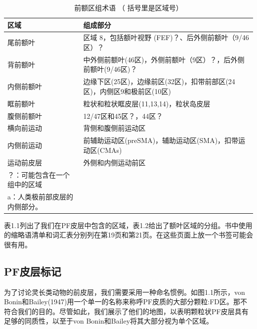 \begin{table}[htbp]
	\newcommand{\tabincell}[2]{\begin{tabular}{@{}#1@{}}#2\end{tabular}} %
	\centering
	\caption{前额区组术语 （ 括号里是区域号）}
	\renewcommand\arraystretch{1.5}	%
	\begin{tabular}{ll}
		\toprule
		区域 & 组成部分 \\
		\midrule
		尾前额叶 & 区域 8，包括额叶视野 (FEF)？、后外侧前额叶（9/46区）？  \\
		背前额叶 & 中外侧前额叶(46区)，外侧前额叶（9区）？，后外侧前额叶(9/46区)？ \\
		内侧前额叶&边缘下区(25区)，边缘前区(32区)，扣带前部区(24区)，内侧区9和极前区(10区)  \\
		眶前额叶 & 粒状和粒状眶皮层(11,13,14)，粒状岛皮层  \\
		腹侧前额叶&12/47区和45区？，44区？ \\
		横向前运动& 背侧和腹侧前运动区\\
		内侧前运动& 前辅助运动区(preSMA)，辅助运动区(SMA)，扣带运动区(CMAs)  \\
		运动前皮层& 外侧和内侧运动前区  \\
		\bottomrule
	\par？：可能包含在一个组中的区域\\
		\par a：人类极前部皮层的内侧部分。
	\end{tabular}%
\end{table}%


\par
表1.1列出了我们在PF皮层中包含的区域，表1.2给出了额叶区域的分组。书中使用的缩略语清单和词汇表分别列在第19页和第21页。在这些页面上放一个书签可能会很有用。


\subsection{PF皮层标记}
为了讨论灵长类动物的前皮层，我们需要采用一种命名惯例。如图1.1所示，von Bonin和Bailey(1947)用一个单一的名称来称呼PF皮质的大部分颗粒:FD区。那不符合我们的目的。尽管如此，我们展示了他们的地图，以表明颗粒状PF皮层具有足够的同质性，以至于von Bonin和Bailey将其大部分视为单个区域。

